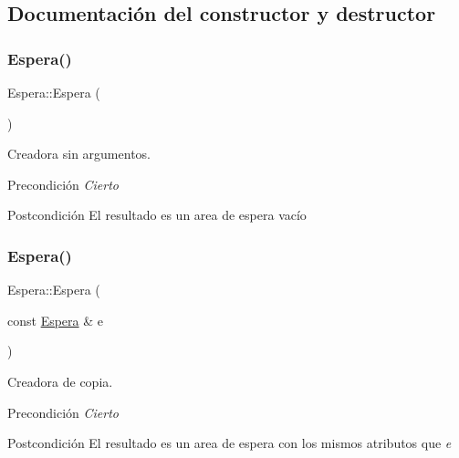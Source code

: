\subsection{Documentación del constructor y destructor}
\mbox{\label{class_espera_aeabb86dcbffd8c2b686fe330581ac82b}} 
\subsubsection{\texorpdfstring{Espera()}{Espera()}\hspace{0.1cm}{\footnotesize\ttfamily [1/2]}}
{\footnotesize\ttfamily Espera\+::\+Espera (\begin{DoxyParamCaption}{ }\end{DoxyParamCaption})}



Creadora sin argumentos. 

\begin{DoxyPrecond}{Precondición}
{\itshape Cierto} 
\end{DoxyPrecond}
\begin{DoxyPostcond}{Postcondición}
El resultado es un area de espera vacío 
\end{DoxyPostcond}
\mbox{\label{class_espera_ad49a61099324e72417baa38ec365a475}} 
\subsubsection{\texorpdfstring{Espera()}{Espera()}\hspace{0.1cm}{\footnotesize\ttfamily [2/2]}}
{\footnotesize\ttfamily Espera\+::\+Espera (\begin{DoxyParamCaption}\item[{const \hyperlink{class_espera}{Espera} \&}]{e }\end{DoxyParamCaption})}



Creadora de copia. 

\begin{DoxyPrecond}{Precondición}
{\itshape Cierto} 
\end{DoxyPrecond}
\begin{DoxyPostcond}{Postcondición}
El resultado es un area de espera con los mismos atributos que {\itshape e} 
\end{DoxyPostcond}
\mbox{\label{class_espera_a970b7c780ad48f158c408586d4b3b4b3}} 
